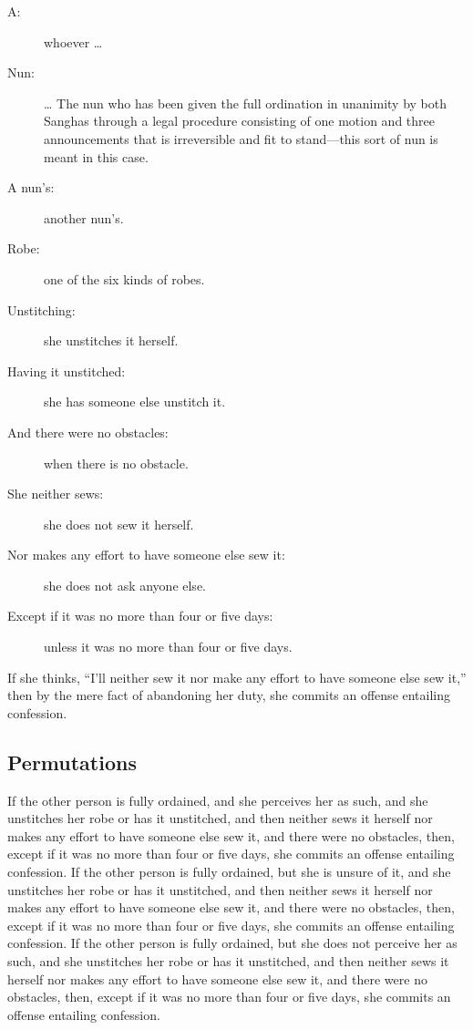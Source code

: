 \documentclass[12pt,openany]{book}%
\begin{document}
\begin{description}%
\item[A: ] whoever … %
\item[Nun: ] … The nun who has been given the full ordination in unanimity by both Sanghas through a legal procedure consisting of one motion and three announcements that is irreversible and fit to stand—this sort of nun is meant in this case. %
\item[A nun’s: ] another nun’s. %
\item[Robe: ] one of the six kinds of robes. %
\item[Unstitching: ] she unstitches it herself. %
\item[Having it unstitched: ] she has someone else unstitch it. %
\item[And there were no obstacles: ] when there is no obstacle. %
\item[She neither sews: ] she does not sew it herself. %
\item[Nor makes any effort to have someone else sew it: ] she does not ask anyone else. %
\item[Except if it was no more than four or five days: ] unless it was no more than four or five days. %
\end{description}

If she thinks, “I’ll neither sew it nor make any effort to have someone else sew it,” then by the mere fact of abandoning her duty, she commits an offense entailing confession. 

\subsection*{Permutations }

If the other person is fully ordained, and she perceives her as such, and she unstitches her robe or has it unstitched, and then neither sews it herself nor makes any effort to have someone else sew it, and there were no obstacles, then, except if it was no more than four or five days, she commits an offense entailing confession. If the other person is fully ordained, but she is unsure of it, and she unstitches her robe or has it unstitched, and then neither sews it herself nor makes any effort to have someone else sew it, and there were no obstacles, then, except if it was no more than four or five days, she commits an offense entailing confession. If the other person is fully ordained, but she does not perceive her as such, and she unstitches her robe or has it unstitched, and then neither sews it herself nor makes any effort to have someone else sew it, and there were no obstacles, then, except if it was no more than four or five days, she commits an offense entailing confession. 
\end{document}
